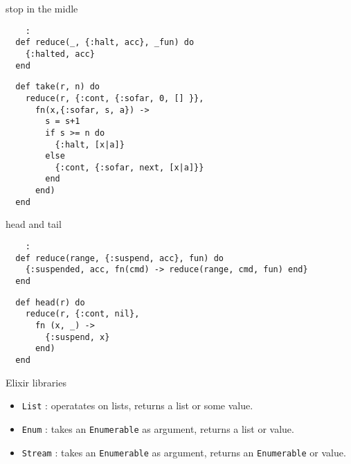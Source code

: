 \begin{frame}[fragile]{stop in the midle}

\begin{verbatim}
    :
  def reduce(_, {:halt, acc}, _fun) do
    {:halted, acc}
  end
\end{verbatim}

\pause
\begin{verbatim}
  def take(r, n) do
    reduce(r, {:cont, {:sofar, 0, [] }},
      fn(x,{:sofar, s, a}) ->
        s = s+1
        if s >= n do
          {:halt, [x|a]}
        else
          {:cont, {:sofar, next, [x|a]}}
        end
      end)
  end    
\end{verbatim}
  
  
\end{frame}

\begin{frame}[fragile]{ head and tail }

\begin{verbatim}
    :
  def reduce(range, {:suspend, acc}, fun) do
    {:suspended, acc, fn(cmd) -> reduce(range, cmd, fun) end}
  end
\end{verbatim}
  \pause


\begin{verbatim}
  def head(r) do
    reduce(r, {:cont, nil},
      fn (x, _) ->
        {:suspend, x}
      end)
  end
\end{verbatim}
  
\end{frame}

\begin{frame}{Elixir libraries}

  \begin{itemize}
  \item {\tt List} : operatates on lists, returns a list or some value.  \pause
  \item {\tt Enum} : takes an {\tt Enumerable} as argument, returns a list or value. \pause
  \item {\tt Stream} : takes an {\tt Enumerable} as argument, returns an {\tt Enumerable} or value. 
  \end{itemize}

  \vspace{20pt}
  
\end{frame}


